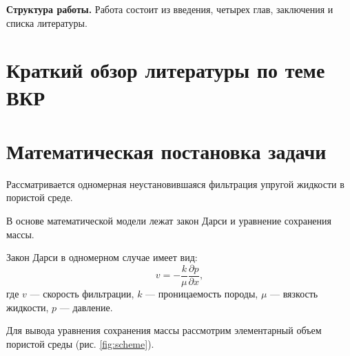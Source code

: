 \documentclass[12pt, a4paper]{article}
\begin{document}
\textbf{Структура работы.} Работа состоит из введения, четырех глав, заключения и списка литературы.

\newpage
\section{Краткий обзор литературы по теме ВКР}


\newpage

\section{Математическая постановка задачи}

Рассматривается одномерная неустановившаяся фильтрация упругой жидкости в пористой среде.

В основе математической модели лежат закон Дарси и уравнение сохранения массы.

Закон Дарси в одномерном случае имеет вид:
\begin{equation}
    v = -\frac{k}{\mu} \frac{\partial p}{\partial x},
\end{equation}
где \(v\) — скорость фильтрации, \(k\) — проницаемость породы, \(\mu\) — вязкость жидкости, \(p\) — давление.

Для вывода уравнения сохранения массы рассмотрим элементарный объем пористой среды (рис. \ref{fig:scheme}).
\end{document}
